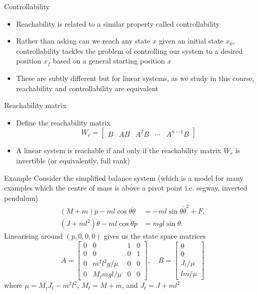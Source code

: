 \documentclass[10pt]{beamer-control}
\begin{document}
\begin{frame}{Controllability}
  \begin{itemize}
    \item Reachability is related to a similar property called \alert{controllability}
    \item Rather than asking can we reach any state $x$ given an initial state $x_0$, controllability tackles the problem of controlling our system to a desired position $x_f$ based on a general starting position $x$
    \item These are subtly different but for linear systems, as we study in this course, reachability and controllability are equivalent
  \end{itemize}
\end{frame}



\begin{frame}{Reachability matrix}
  \begin{itemize}
    \item Define the reachability matrix
      \begin{equation}
        W_r = \begin{bmatrix}
          B & AB & A^2 B & \cdots & A^{n-1}B
        \end{bmatrix}
      \end{equation}
    \item A linear system is reachable if and only if the reachability matrix $W_r$ is invertible (or equivalently, full rank)
  \end{itemize}

\end{frame}

\begin{frame}{Example}
  Consider the simplified balance system (which is a model for many examples which the centre of mass is above a pivot point i.e. segway, inverted pendulum)
  \begin{align}
    (M+m)\ddot{p}-ml\cos \theta \ddot{\theta} &= -ml\sin\theta \dot{\theta}^2+F,\\
    (J+ml^2)\ddot{\theta} -ml\cos \theta \ddot{p} &= mgl\sin \theta.
  \end{align}
  Linearising around $(p,0,0,0)$ gives us the state space matrices
  \begin{equation}
    A=\begin{bmatrix}
      0 & 0 & 1 & 0\\
      0 & 0 & 0 & 1\\
      0 & m^2l^2g/\mu & 0 & 0 \\ 0& M_tmgl/\mu & 0 & 0
    \end{bmatrix}, \quad
    B = \begin{bmatrix}
      0 \\ 0 \\ J_t/\mu \\ lm/\mu
    \end{bmatrix}
  \end{equation}
  where $\mu=M_tJ_t-m^2l^2$, $M_t=M+m$, and $J_t=J+ml^2$
\end{frame}
\end{document}
